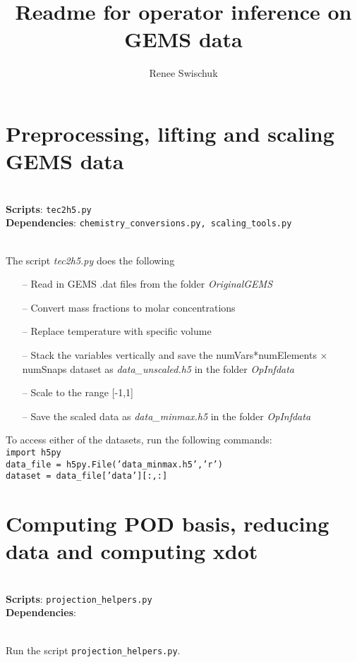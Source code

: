 \documentclass[11pt]{article} %
\title{Readme for operator inference on GEMS data}
\author{Renee Swischuk}
\newcommand{\code}[1]{\colorbox{light-gray}{\texttt{#1}}}
\begin{document}
\maketitle
\section{Preprocessing, lifting and scaling GEMS data}
\hrulefill\\
\textbf{Scripts}: \code{tec2h5.py}\\
\textbf{Dependencies}: \code{chemistry\_conversions.py, scaling\_tools.py}

\noindent\hrulefill\\
The script \textit{tec2h5.py} does the following
\begin{itemize}
\item[--] Read in GEMS .dat files from the folder \textit{OriginalGEMS}
\item[--] Convert mass fractions to molar concentrations 
\item[--] Replace temperature with specific volume
\item[--] Stack the variables vertically and save the numVars*numElements $\times$ numSnaps dataset as \textit{data\_unscaled.h5} in the folder \textit{OpInfdata}
\item[--] Scale to the range [-1,1]
\item[--] Save the scaled data as \textit{data\_minmax.h5} in the folder \textit{OpInfdata}
\end{itemize}

\noindent To access either of the datasets, run the following commands:\\
\code{import h5py}\\
\code{data\_file = h5py.File('data\_minmax.h5','r')}\\
\code{dataset = data\_file['data'][:,:]}
\newpage
\section{Computing POD basis, reducing data and computing xdot}
\hrulefill\\
\textbf{Scripts}: \code{projection\_helpers.py}\\
\textbf{Dependencies}: 

\noindent\hrulefill\\

\noindent Run the script \code{projection\_helpers.py}.\\
\end{document}
